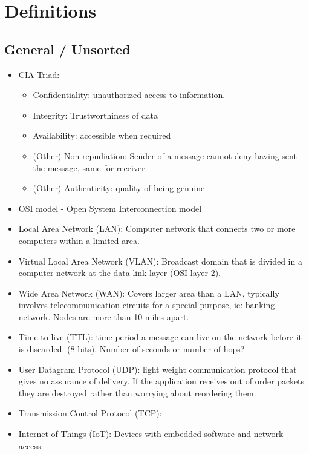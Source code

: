 \section{Definitions}
\subsection{General / Unsorted}
\begin{itemize}
    \item CIA Triad: 
    \begin{itemize}
        \item Confidentiality: unauthorized access to information.
        \item Integrity: Trustworthiness of data
        \item Availability: accessible when required
        \item (Other) Non-repudiation: Sender of a message cannot deny having sent the message, same for receiver.
        \item (Other) Authenticity: quality of being genuine
    \end{itemize}
	\item OSI model - Open System Interconnection model
	\item Local Area Network (LAN): Computer network that connects two or more computers within a limited area.
	\item Virtual Local Area Network (VLAN): Broadcast domain that is divided in a computer network at the data link layer (OSI layer 2).
	\item Wide Area Network (WAN): Covers larger area than a LAN, typically involves telecommunication circuits for a special purpose, ie: banking network. Nodes are more than 10 miles apart.
	\item Time to live (TTL): time period a message can live on the network before it is discarded. (8-bits). Number of seconds or number of hops?
	\item User Datagram Protocol (UDP): light weight communication protocol that gives no assurance of delivery.
	If the application receives out of order packets they are destroyed rather than worrying about reordering them.
	\item Transmission Control Protocol (TCP): 
	\item Internet of Things (IoT): Devices with embedded software and network access.
	

\end{itemize}
